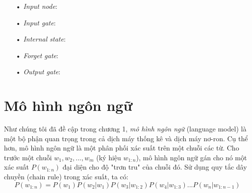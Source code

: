 \begin{itemize}
	\item[•] \textit{Input node}:
	\item[•] \textit{Input gate}:
	\item[•] \textit{Internal state}:
	\item[•] \textit{Forget gate}:
	\item[•] \textit{Output gate}:
\end{itemize}



\section{Mô hình ngôn ngữ}

Như chúng tôi đã đề cập trong chương 1, \textit{mô hình ngôn ngữ} (language model) là một bộ phận quan trọng trong cả dịch máy thống kê và dịch máy nơ-ron. Cụ thể hơn, mô hình ngôn ngữ là một phân phối xác suất trên một chuỗi các từ. Cho trước một chuỗi $w_1,w_2,...,w_m$ (ký hiệu $w_{1:n}$), mô hình ngôn ngữ gán cho nó một xác suất $P(w_{1:n})$ đại diện cho độ "trơn tru" của chuỗi đó. Sử dụng quy tắc dây chuyền (chain rule) trong xác suất, ta có:
\begin{equation} \label{lmGeneral}
	P(w_{1:n}) = P(w_1)P(w_2|w_1)P(w_3|w_{1:2})P(w_4|w_{1:3})...P(w_n|w_{1:n-1})
\end{equation}














